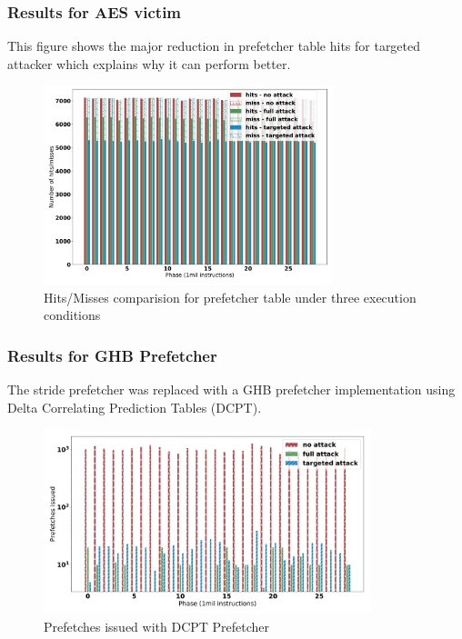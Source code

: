 \documentclass[10pt,usenames,dvipsnames]{beamer}
\begin{document}
\begin{frame}
\frametitle{Results for AES victim}
This figure shows the major reduction in prefetcher table hits for targeted attacker which
explains why it can perform better.
\begin{figure}[ht]
    \centering
    \includegraphics[width=0.75\textwidth]{pf_hits}
    \caption{Hits/Misses comparision for prefetcher table under three execution conditions}
\end{figure}
\end{frame}

\begin{frame}
\frametitle{Results for GHB Prefetcher}
The stride prefetcher was replaced with a GHB prefetcher implementation
using Delta Correlating Prediction Tables (DCPT).
\begin{figure}[ht]
    \centering
    \includegraphics[width=0.85\textwidth]{dcpt-hwpf}
    \caption{Prefetches issued with DCPT Prefetcher}
\end{figure}
\end{frame}
\end{document}
